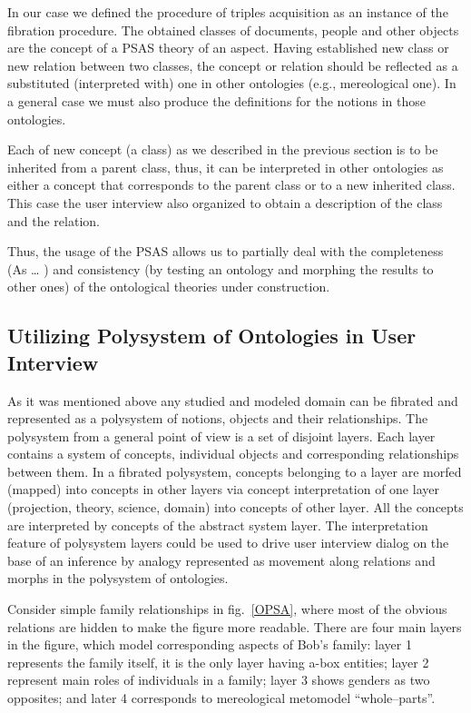 \documentclass[conference]{IEEEtran}
\begin{document}
In our case we defined the procedure of triples acquisition as an instance of the fibration procedure. The obtained classes of documents, people and other objects are the concept of a PSAS theory of an aspect. Having established new class or new relation between two classes, the concept or relation should be reflected as a substituted (interpreted with) one in other ontologies (e.g., mereological one). In a general case we must also produce the definitions for the notions in those ontologies.

Each of new concept (a class) as we described in the previous section is to be inherited from a parent class, thus, it can be interpreted in other ontologies as either a concept that corresponds to the parent class or to a new inherited class. This case the user interview also organized to obtain a description of the class and the relation.

Thus, the usage of the PSAS allows us to partially deal with the completeness (As \ldots{} \cite{sergey}) and consistency (by testing an ontology and morphing the results to other ones) of the ontological theories under construction.

\subsection{Utilizing Polysystem of Ontologies in User Interview}
As it was mentioned above any studied and modeled domain can be fibrated and represented as a polysystem of notions, objects and their relationships. The polysystem from a general point of view is a set of disjoint layers. Each layer contains a system of concepts, individual objects and corresponding relationships between them. In a fibrated polysystem, concepts belonging to a layer are morfed (mapped) into concepts in other layers via concept interpretation of one layer (projection, theory, science, domain) into concepts of other layer. All the concepts are interpreted by concepts of the abstract system layer. The interpretation feature of polysystem layers could be used to drive user interview dialog on the base of an inference by analogy represented as movement along relations and morphs in the polysystem of ontologies.

Consider simple family relationships in fig.~\ref{OPSA}, where most of the obvious relations are hidden to make the figure more readable. There are four main layers in the figure, which model corresponding aspects of Bob's family: layer 1 represents the family itself, it is the only layer having a-box entities; layer 2 represent main roles of individuals in a family; layer 3 shows genders as two opposites; and later 4 corresponds to mereological metomodel ``whole--parts''.
\end{document}

